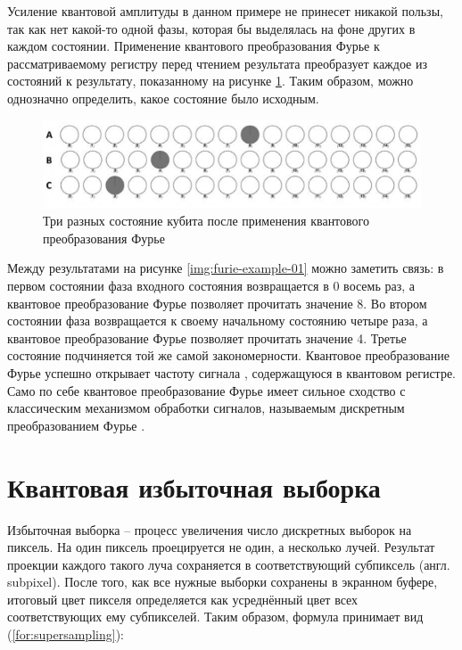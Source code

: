 Усиление квантовой амплитуды в данном примере не принесет никакой пользы, так как нет какой-то одной фазы, которая бы выделялась на фоне других в каждом состоянии. Применение квантового преобразования Фурье к рассматриваемому регистру перед чтением результата преобразует каждое из состояний к результату, показанному на рисунке \ref{img:furie-example-02}. Таким образом, можно однозначно определить, какое состояние было исходным.

\begin{figure}[h]
	\begin{center}
		\includegraphics[scale=0.4]{img/furie-example-02.png}
	\end{center}
	\captionsetup{justification=centering}
	\caption{Три разных состояние кубита после применения квантового преобразования Фурье}
	\label{img:furie-example-02}
\end{figure}

Между результатами на рисунке \ref{img:furie-example-01} можно заметить связь: в первом состоянии фаза входного состояния возвращается в 0 восемь раз, а квантовое преобразование Фурье позволяет прочитать значение 8. Во втором состоянии  фаза возвращается к своему начальному состоянию четыре раза, а квантовое преобразование Фурье позволяет прочитать значение 4. Третье состояние подчиняется той же самой закономерности. Квантовое преобразование Фурье успешно открывает частоту сигнала \cite{signal}, содержащуюся в квантовом регистре. Само по себе квантовое преобразование Фурье имеет сильное сходство с классическим механизмом обработки сигналов, называемым дискретным преобразованием Фурье \cite{PQC-furie-proof}.

\section{Квантовая избыточная выборка}

Избыточная выборка -- процесс увеличения число дискретных выборок на пиксель. На один пиксель проецируется не один, а несколько лучей. Результат проекции каждого такого луча сохраняется в соответствующий субпиксель (англ. subpixel). После того, как все нужные выборки сохранены в экранном буфере, итоговый цвет пикселя определяется как усреднённый цвет всех соответствующих ему субпикселей. Таким образом, формула принимает вид (\ref{for:supersampling}): 

